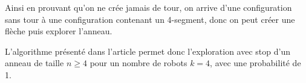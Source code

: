 \documentclass[11pt,letter]{../../pactole-git/tex/llncs} %
\begin{document}
Ainsi en prouvant qu'on ne crée jamais de tour, on arrive d'une configuration sans tour à une 
configuration contenant un 4-segment, donc on peut créer une flèche puis explorer l'anneau.

L'algorithme présenté dans l'article permet donc l'exploration avec stop d'un anneau de taille $n\ge4$ pour un nombre de robots $k=4$, avec une probabilité de 1.
\end{document}
